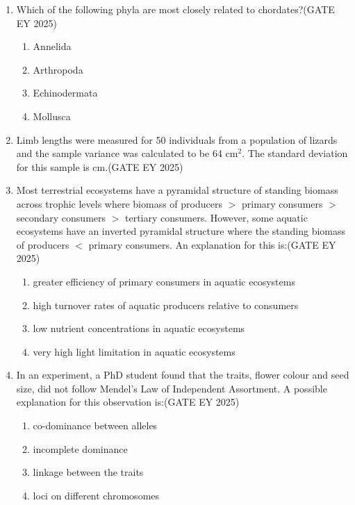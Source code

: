 \begin{enumerate}[leftmargin=*,label=\textbf{Q.\arabic*}]
\item Which of the following phyla are most closely related to chordates?\hfill {(GATE EY 2025)}
\begin{multicols}{2}
\begin{enumerate}
\item Annelida
\item Arthropoda
\item Echinodermata
\item Mollusca
\end{enumerate}
\end{multicols}

\item Limb lengths were measured for 50 individuals from a population of lizards and the sample variance was calculated to be 64 cm$^2$. The standard deviation for this sample is \underline{\hspace{2cm}} cm.\hfill {(GATE EY 2025)}
\item Most terrestrial ecosystems have a pyramidal structure of standing biomass across trophic levels where biomass of producers $>$ primary consumers $>$ secondary consumers $>$ tertiary consumers. However, some aquatic ecosystems have an inverted pyramidal structure where the standing biomass of producers $<$ primary consumers. An explanation for this is:\hfill {(GATE EY 2025)}
\begin{multicols}{2}
\begin{enumerate}
\item greater efficiency of primary consumers in aquatic ecosystems
\item high turnover rates of aquatic producers relative to consumers
\item low nutrient concentrations in aquatic ecosystems
\item very high light limitation in aquatic ecosystems
\end{enumerate}
\end{multicols}

\item In an experiment, a PhD student found that the traits, flower colour and seed size, did not follow Mendel’s Law of Independent Assortment. A possible explanation for this observation is:\hfill {(GATE EY 2025)}
\begin{multicols}{2}
\begin{enumerate}
\item co-dominance between alleles
\item incomplete dominance
\item linkage between the traits
\item loci on different chromosomes
\end{enumerate}
\end{multicols}


\end{enumerate}
